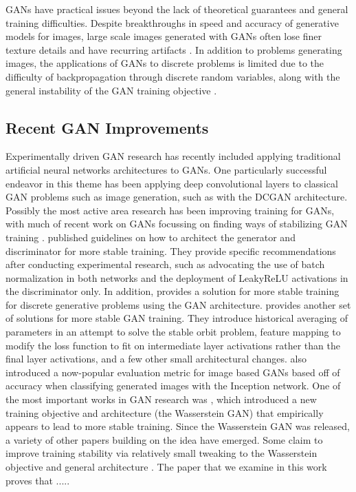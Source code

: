 \documentclass{article}
\begin{document}
GANs have practical issues beyond the lack of theoretical guarantees and general training difficulties. Despite breakthroughs in speed and accuracy of generative models for images, large scale images generated with GANs often lose finer texture details and have recurring artifacts \citep{DBLP:journals/corr/LedigTHCATTWS16} \citep{Salimans2016} \citep{DBLP:journals/corr/ShrivastavaPTSW16}. In addition to problems generating images, the applications of GANs to discrete problems is limited due to the difficulty of backpropagation through discrete random variables, along with the general instability of the GAN training objective \citep{Che+al-2017-augmented}. 

\subsection{Recent GAN Improvements}
Experimentally driven GAN research has recently included applying traditional artificial neural networks architectures to GANs. One particularly successful endeavor in this theme has been applying deep convolutional layers to classical GAN problems such as image generation, such as with the DCGAN architecture. Possibly the most active area research has been improving training for GANs, with much of recent work on GANs focussing on finding ways of stabilizing GAN training \citep{Salimans2016} \citep{DBLP:journals/corr/ArjovskyCB17} \citep{DBLP:conf/nips/NowozinCT16} \citep{DBLP:journals/corr/MetzPPS16}. \citet{DBLP:journals/corr/RadfordMC15} published guidelines on how to architect the generator and discriminator for more stable training. They provide specific recommendations after conducting experimental research, such as advocating the use of batch normalization in both networks and the deployment of LeakyReLU activations in the discriminator only. In addition, \citet{DBLP:journals/corr/HjelmJCCB17} provides a solution for more stable training for discrete generative problems using the GAN architecture. \citet{Salimans2016} provides another set of solutions for more stable GAN training. They introduce historical averaging of parameters in an attempt to solve the stable orbit problem, feature mapping to modify the loss function to fit on intermediate layer activations rather than the final layer activations, and a few other small architectural changes. \citet{Salimans2016} also introduced a now-popular evaluation metric for image based GANs based off of accuracy when classifying generated images with the Inception network. One of the most important works in GAN research was \citet{DBLP:journals/corr/ArjovskyCB17}, which introduced a new training objective and architecture (the Wasserstein GAN) that empirically appears to lead to more stable training. Since the Wasserstein GAN was released, a variety of other papers building on the idea have emerged. Some claim to improve training stability via relatively small tweaking to the Wasserstein objective and general architecture \citep{DBLP:journals/corr/GulrajaniAADC17}. The paper that we examine in this work proves that ..... 
\end{document}
